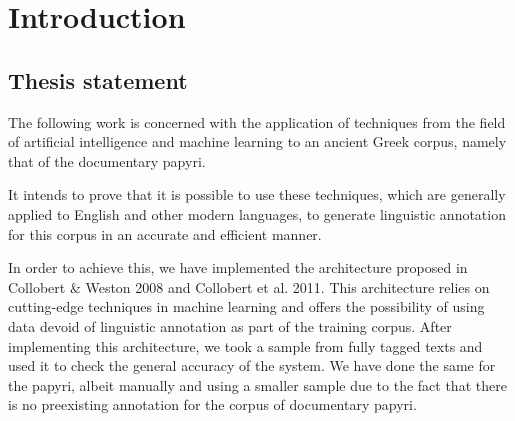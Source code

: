 \chapter{Introduction} 
\label{chp:introduction}


\section{Thesis statement}

The following work is concerned with the application of techniques
from the field of artificial intelligence and machine learning to an
ancient Greek corpus, namely that of the documentary papyri.

It intends to prove that it is possible to use these techniques, which
are generally applied to English and other modern languages, to
generate linguistic annotation for this corpus in an accurate and
efficient manner.

In order to achieve this, we have implemented the architecture proposed
in Collobert \& Weston 2008 and Collobert et al. 2011. This
architecture relies on cutting-edge techniques in machine learning and
offers the possibility of using data devoid of linguistic annotation
as part of the training corpus. After implementing this architecture,
we took a sample from fully tagged texts and used it to check the
general accuracy of the system. We have done the same for the papyri,
albeit manually and using a smaller sample due to the fact that there
is no preexisting annotation for the corpus of documentary papyri.


